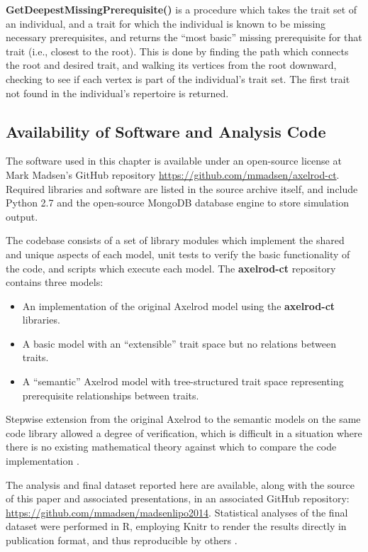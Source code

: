 \documentclass[graybox,natbib]{svmult}
\begin{document}
\textbf{GetDeepestMissingPrerequisite()} is a procedure which takes the trait set of an individual, and a trait for which the individual is known to be missing necessary prerequisites, and returns the ``most basic'' missing prerequisite for that trait (i.e., closest to the root). This is done by finding the path which connects the root and desired trait, and walking its vertices from the root downward, checking to see if each vertex is part of the individual's trait set.  The first trait not found in the individual's repertoire is returned.  

\subsection{Availability of Software and Analysis
Code}\label{availability-of-software-and-analysis-code}

The software used in this chapter is available under an open-source
license at Mark Madsen's GitHub repository
\url{https://github.com/mmadsen/axelrod-ct}. Required libraries and
software are listed in the source archive itself, and include Python 2.7
and the open-source MongoDB database engine to store simulation output.

The codebase consists of a set of library modules which implement the
shared and unique aspects of each model, unit tests to verify the basic
functionality of the code, and scripts which execute each model. The
\textbf{axelrod-ct} repository contains three models:

\begin{itemize}
\item
  An implementation of the original Axelrod model using the
  \textbf{axelrod-ct} libraries.
\item
  A basic model with an ``extensible'' trait space but no relations
  between traits.
\item
  A ``semantic'' Axelrod model with tree-structured trait space
  representing prerequisite relationships between traits.
\end{itemize}

Stepwise extension from the original Axelrod to the semantic models on
the same code library allowed a degree of verification, which is
difficult in a situation where there is no existing mathematical theory
against which to compare the code implementation
\citep{national2012Assessing}.

The analysis and final dataset reported here are available, along with
the source of this paper and associated presentations, in an associated
GitHub repository: \url{https://github.com/mmadsen/madsenlipo2014}.
Statistical analyses of the final dataset were performed in R, employing
Knitr to render the results directly in publication format, and thus
reproducible by others \citep{xie2013dynamic}.





\end{document}
